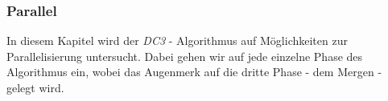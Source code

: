 \subsubsection{Parallel}
\label{dc3-parallel}

In  diesem Kapitel wird der \emph{DC3} - Algorithmus auf Möglichkeiten zur Parallelisierung untersucht. Dabei gehen wir auf jede einzelne Phase des Algorithmus ein, wobei das Augenmerk auf die dritte Phase - dem Mergen - gelegt wird.




